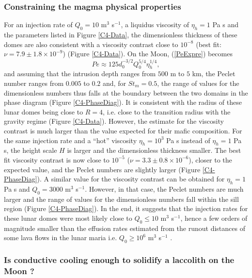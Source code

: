 \subsubsection*{Constraining the magma physical properties}
\label{sec:visc-contr-lunar}

For  an  injection  rate  of $Q_0=10$  m$^{3}$  s$^{-1}$,  a  liquidus
viscosity of  $\eta_h= 1$  Pa s  and the  parameters listed  in Figure
\ref{C4-Data},  the dimensionless  thickness of  these domes  are also
consistent with  a viscosity  contrast close  to $10^{-8}$  (best fit:
$\nu=7.9  \pm 1.8  \times  10^{-9}$) (Figure  \ref{C4-Data}).  On  the
Moon, (\ref{PeExpre}) becomes
\begin{equation}
  Pe \approx 125 d_0^{-3/2} Q_0^{5/4}\eta_h^{1/4},
  \label{PeExpreMoon}
\end{equation}
and assuming that  the intrusion depth ranges from $500$  m to $5$ km,
the Peclet  number ranges from  $0.005$ to $0.2$ and,  for $St_m=0.5$,
the range  of values for the  dimensionless numbers thus falls  at the
boundary  between  the  two  domains  in  the  phase  diagram  (Figure
\ref{C4-PhaseDiag}).  It is consistent with  the radius of these lunar
domes being close to $R=4$, i.e.   close to the transition radius with
the gravity regime (Figure  \ref{C4-Data}).  However, the estimate for
the  viscosity contrast  is much  larger than  the value  expected for
their mafic  composition.  For the  same injection rate and  a ``hot''
viscosity $\eta_h=10^3$  Pa s instead  of $\eta_h=1$ Pa s,  the height
scale $H$ is larger and  the dimensionless thickness smaller. The best
fit    viscosity    contrast    is     now    close    to    $10^{-5}$
($\nu = 3.3 \pm 0.8 \times10^{-6}$), closer to the expected value, and
the Peclet numbers are slightly larger (Figure \ref{C4-PhaseDiag}).  A
similar  value  for  the  viscosity   contrast  can  be  obtained  for
$\eta_h=1$ Pa s and $Q_0=3000$ m$^3$ s$^{-1}$.  However, in that case,
the Peclet  numbers are much  larger and the  range of values  for the
dimensionless   numbers   fall   within  the   sill   region   (Figure
\ref{C4-PhaseDiag}).  In the end, it suggests that the injection rates
for these  lunar domes were most  likely close to $Q_0\le  10$ m$^{3}$
s$^{-1}$, hence  a few orders  of magnitude smaller than  the effusion
rates estimated  from the runout distances  of some lava flows  in the
lunar     maria     i.e.      $Q_0\ge     10^6$     m$^3$     s$^{-1}$
\citep{TracyKPGregg:1996wp}.

\subsubsection*{Is conductive  cooling enough to solidify  a laccolith
  on the Moon ?}
\label{sec:visc-contr-lunar}

